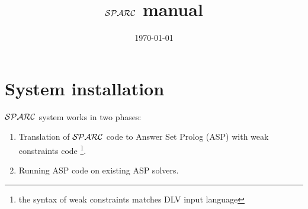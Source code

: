 \documentclass[12pt, letterpaper]{article}
\begin{document}
\newcommand{\hide}[1]{}
\newcommand{\exercise}[1]{}
\newcommand{\future}[1]{}
\newcommand{\otherquestions}[1]{}
\newcommand{\set}[1]{\{#1\}}
\newcommand{\pg}[1]{{\tt #1}}
\newtheorem{definition}{Definition}
\newcommand{\emptyclause}{\Box}
\def\st{\bigskip\noindent}
\newcommand{\lplus}
{
   \stackrel{+}{\gets}
}

\newcommand{\fe}[1] {
  \begin{frame}
    #1
  \end{frame}}

\newcommand{\eoa}{ {\bf End} of algorithm}

\newcommand{\ft}[1] {\frametitle{#1}}

\newcommand{\ie}[1] {
  \begin{itemize}
    #1
  \end{itemize}
}

\newcommand{\ee}[1] {
  \begin{enumerate}
    #1
  \end{enumerate}\label{marker}
}
\newcommand{\blk}[2] {
  \begin{block}{#1}
    #2
  \end{block}
}

\newtheorem{collorary}{Corollary}
\newtheorem{proposition}{Proposition}
\newtheorem{invariant}{Invariant}
\newtheorem{property}{Property}
\newtheorem{claim}{Claim}
\newtheorem{example}{Example}


\title{${\cal SPARC}$ manual}
\date{\today}
\maketitle
\tableofcontents
\pagebreak


\section{System installation}
${\cal SPARC}$ system  works in two phases:
\begin{enumerate}
\item Translation of ${\cal SPARC}$ code to Answer Set Prolog (ASP)\cite{gelfond1991classical} with weak constraints\cite{buccafurri1997strong} code 
\footnote{the syntax of weak constraints matches DLV input language}.
\item Running ASP code on existing ASP solvers.
\end{enumerate}
\end{document}
